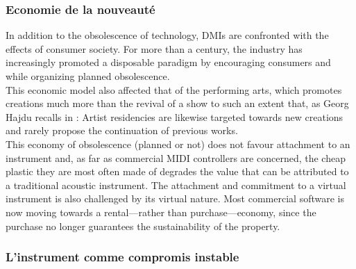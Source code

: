 	
\subsubsection{Economie de la nouveauté}

In addition to the obsolescence of technology, DMIs are confronted with the effects of consumer society. For more than a century, the industry has increasingly promoted a disposable paradigm by encouraging consumers  \cite{slade_made_2006} and while organizing planned obsolescence.\\
\indent This economic model also affected that of the performing arts, which promotes creations much more than the revival of a show to such an extent that, as Georg Hajdu recalls in \cite{hajdu_disposable_2016}:  Artist residencies are likewise targeted towards new creations and rarely propose the continuation of previous works.\\
\indent This economy of obsolescence (planned or not) does not favour attachment to an instrument and, as far as commercial MIDI controllers are concerned, the cheap plastic they are most often made of degrades the value that can be attributed to a traditional acoustic instrument. The attachment and commitment to a virtual instrument is also challenged by its virtual nature. Most commercial software is now moving towards a rental—rather than purchase—economy, since the purchase no longer guarantees the sustainability of the property.
	
\subsubsection{L'instrument comme compromis instable}

